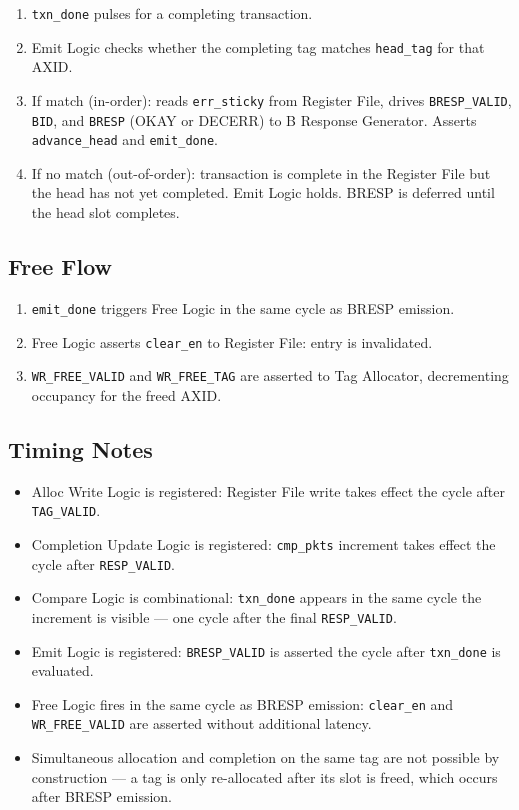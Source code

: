 \begin{enumerate}
  \item \texttt{txn\_done} pulses for a completing transaction.
  \item Emit Logic checks whether the completing tag matches
        \texttt{head\_tag} for that AXID.
  \item If match (in-order): reads \texttt{err\_sticky} from Register
        File, drives \texttt{BRESP\_VALID}, \texttt{BID}, and
        \texttt{BRESP} (OKAY or DECERR) to B Response Generator.
        Asserts \texttt{advance\_head} and \texttt{emit\_done}.
  \item If no match (out-of-order): transaction is complete in the
        Register File but the head has not yet completed. Emit Logic
        holds. BRESP is deferred until the head slot completes.
\end{enumerate}

\subsection{Free Flow}

\begin{enumerate}
  \item \texttt{emit\_done} triggers Free Logic in the same cycle as
        BRESP emission.
  \item Free Logic asserts \texttt{clear\_en} to Register File:
        entry is invalidated.
  \item \texttt{WR\_FREE\_VALID} and \texttt{WR\_FREE\_TAG} are
        asserted to Tag Allocator, decrementing occupancy for the
        freed AXID.
\end{enumerate}

\subsection{Timing Notes}

\begin{itemize}
  \item Alloc Write Logic is registered: Register File write takes
        effect the cycle after \texttt{TAG\_VALID}.
  \item Completion Update Logic is registered: \texttt{cmp\_pkts}
        increment takes effect the cycle after \texttt{RESP\_VALID}.
  \item Compare Logic is combinational: \texttt{txn\_done} appears in
        the same cycle the increment is visible — one cycle after the
        final \texttt{RESP\_VALID}.
  \item Emit Logic is registered: \texttt{BRESP\_VALID} is asserted
        the cycle after \texttt{txn\_done} is evaluated.
  \item Free Logic fires in the same cycle as BRESP emission:
        \texttt{clear\_en} and \texttt{WR\_FREE\_VALID} are asserted
        without additional latency.
  \item Simultaneous allocation and completion on the same tag are not
        possible by construction — a tag is only re-allocated after its
        slot is freed, which occurs after BRESP emission.
\end{itemize}

